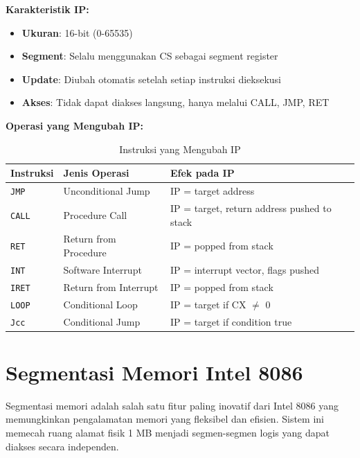 \documentclass[../main.tex]{subfiles}
\begin{document}
    \textbf{Karakteristik IP:}
    \begin{itemize}
        \item \textbf{Ukuran}: 16-bit (0-65535)
        \item \textbf{Segment}: Selalu menggunakan CS sebagai segment register
        \item \textbf{Update}: Diubah otomatis setelah setiap instruksi dieksekusi
        \item \textbf{Akses}: Tidak dapat diakses langsung, hanya melalui CALL, JMP, RET
    \end{itemize}

    \textbf{Operasi yang Mengubah IP:}
    \begin{table}[H]
        \centering
        \caption{Instruksi yang Mengubah IP}
        \begin{tabular}{|p{2.8cm}|p{3.8cm}|p{7cm}|}
            \hline
            \textbf{Instruksi} & \textbf{Jenis Operasi} & \textbf{Efek pada IP} \\
            \hline
            \texttt{JMP} & Unconditional Jump & IP = target address \\
            \hline
            \texttt{CALL} & Procedure Call & IP = target, return address pushed to stack \\
            \hline
            \texttt{RET} & Return from Procedure & IP = popped from stack \\
            \hline
            \texttt{INT} & Software Interrupt & IP = interrupt vector, flags pushed \\
            \hline
            \texttt{IRET} & Return from Interrupt & IP = popped from stack \\
            \hline
            \texttt{LOOP} & Conditional Loop & IP = target if CX $\neq$ 0 \\
            \hline
            \texttt{Jcc} & Conditional Jump & IP = target if condition true \\
            \hline
        \end{tabular}
        \label{tab:ip-modifying-instructions}
    \end{table}

    \section{Segmentasi Memori Intel 8086}
        Segmentasi memori adalah salah satu fitur paling inovatif dari Intel 8086 yang memungkinkan pengalamatan memori yang fleksibel dan efisien. Sistem ini memecah ruang alamat fisik 1 MB menjadi segmen-segmen logis yang dapat diakses secara independen.
\end{document}

